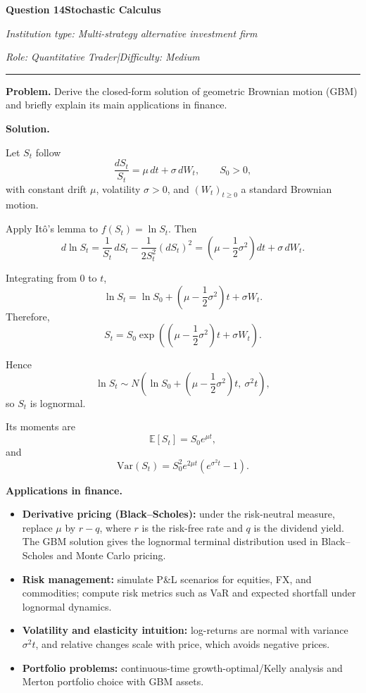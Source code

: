 \documentclass[11pt,letterpaper,openany]{book}
\newcommand{\InterviewQuestionHeader}[5]{%
  \vspace{1.0em}%
  {\large\bfseries #1\enspace #4\par}%
  {\small\itshape Institution type: #2\par}%
  {\small\itshape Role: #3\enspace |\enspace Difficulty: #5\par}%
  \vspace{0.25em}\hrule\vspace{0.45em}%
}
\begin{document}
\InterviewQuestionHeader{Question 14}{Multi-strategy alternative investment firm}{Quantitative Trader}{Stochastic Calculus}{Medium}
\textbf{Problem.} Derive the closed-form solution of geometric Brownian motion (GBM) and briefly explain its main applications in finance.

\textbf{Solution.}

Let \(S_t\) follow
\[
\frac{dS_t}{S_t} = \mu\,dt + \sigma\,dW_t,
\qquad
S_0>0,
\]
with constant drift \(\mu\), volatility \(\sigma>0\), and \((W_t)_{t\ge 0}\) a standard Brownian motion.

Apply Itô's lemma to \(f(S_t)=\ln S_t\). Then
\[
d\ln S_t
=
\frac{1}{S_t}\,dS_t-\frac{1}{2S_t^2}(dS_t)^2
=
\left(\mu-\frac12\sigma^2\right)dt+\sigma\,dW_t.
\]

Integrating from \(0\) to \(t\),
\[
\ln S_t
=
\ln S_0+\left(\mu-\frac12\sigma^2\right)t+\sigma W_t.
\]
Therefore,
\[
S_t
=
S_0\exp\!\left(\left(\mu-\frac12\sigma^2\right)t+\sigma W_t\right).
\]

Hence
\[
\ln S_t \sim N\!\left(\ln S_0+\left(\mu-\frac12\sigma^2\right)t,\ \sigma^2 t\right),
\]
so \(S_t\) is lognormal.

Its moments are
\[
\mathbb{E}[S_t]=S_0 e^{\mu t},
\]
and
\[
\mathrm{Var}(S_t)=S_0^2 e^{2\mu t}\left(e^{\sigma^2 t}-1\right).
\]

\textbf{Applications in finance.}

\begin{itemize}
\item \textbf{Derivative pricing (Black--Scholes):} under the risk-neutral measure, replace \(\mu\) by \(r-q\), where \(r\) is the risk-free rate and \(q\) is the dividend yield. The GBM solution gives the lognormal terminal distribution used in Black--Scholes and Monte Carlo pricing.
\item \textbf{Risk management:} simulate P\&L scenarios for equities, FX, and commodities; compute risk metrics such as VaR and expected shortfall under lognormal dynamics.
\item \textbf{Volatility and elasticity intuition:} log-returns are normal with variance \(\sigma^2 t\), and relative changes scale with price, which avoids negative prices.
\item \textbf{Portfolio problems:} continuous-time growth-optimal/Kelly analysis and Merton portfolio choice with GBM assets.
\end{itemize}
\end{document}
